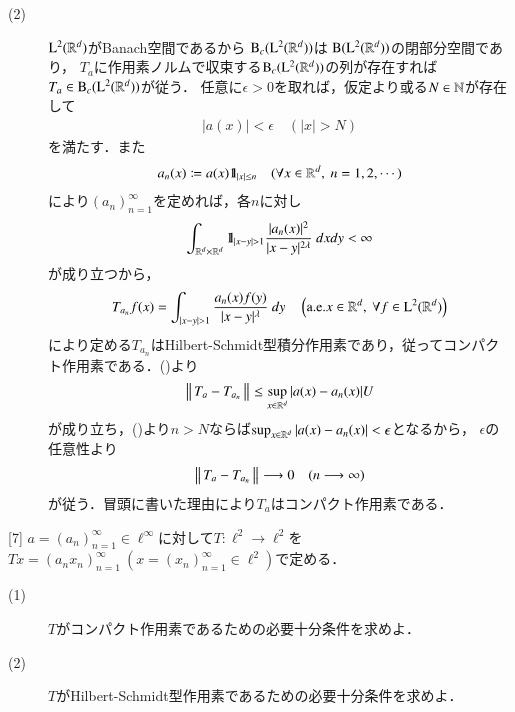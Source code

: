 \begin{prf}
\begin{description}
			\item[(2)] $\mathrm{L}^2(\mathbb{R}^d)$がBanach空間であるから
				$\mathrm{B}_c(\mathrm{L}^2(\mathbb{R}^d)) $は
				$\mathrm{B}(\mathrm{L}^2(\mathbb{R}^d)) $の閉部分空間であり，
				$T_a$に作用素ノルムで収束する$\mathrm{B}_c(\mathrm{L}^2(\mathbb{R}^d)) $の列が存在すれば
				$T_a \in \mathrm{B}_c(\mathrm{L}^2(\mathbb{R}^d)) $が従う．
				任意に$\epsilon > 0$を取れば，仮定より或る$N \in \mathbb{N}$が存在して
				\begin{align}
					|a(x)| < \epsilon \quad (|x| > N)
					\label{eq:report_6_2}
				\end{align}
				を満たす．また
				\begin{align}
					a_n(x) \coloneqq a(x)\mbox{1}\hspace{-0.25em}\mbox{l}_{|x| \leq n}
					\quad (\forall x \in \mathbb{R}^d,\ n=1,2,\cdots)
				\end{align}
				により$(a_n)_{n=1}^{\infty}$を定めれば，各$n$に対し
				\begin{align}
					\int_{\mathbb{R}^d \times \mathbb{R}^d} \mbox{1}\hspace{-0.25em}\mbox{l}_{|x - y| > 1} \frac{|a_n(x)|^2}{|x-y|^{2\lambda}}\ dx dy < \infty
				\end{align}
				が成り立つから，
				\begin{align}
					T_{a_n} f(x) = \int_{|x - y| > 1} \frac{a_n(x)f(y)}{|x-y|^\lambda}\ dy
					\quad \left( \mbox{a.e.}x \in \mathbb{R}^d,\ \forall f \in \mathrm{L}^2(\mathbb{R}^d) \right)
				\end{align}
				により定める$T_{a_n}$はHilbert-Schmidt型積分作用素であり，従ってコンパクト作用素である．()より
				\begin{align}
					\left\|\, T_a - T_{a_n}\, \right\|_{} \leq \operatorname*{sup}_{x \in \mathbb{R}^d} |a(x) - a_n(x)| U
				\end{align}
				が成り立ち，()より$n > N$ならば$\operatorname*{sup}_{x \in \mathbb{R}^d} |a(x) - a_n(x)| < \epsilon$となるから，
				$\epsilon$の任意性より
				\begin{align}
					\left\|\, T_a - T_{a_n}\, \right\|_{} \longrightarrow 0 \quad (n \longrightarrow \infty)
				\end{align}
				が従う．冒頭に書いた理由により$T_a$はコンパクト作用素である．
				\QED
		\end{description}
	\end{prf}
	
\newpage
	\begin{itembox}[l]{[7]}
		$a = (a_n)_{n=1}^{\infty} \in \ell^{\infty}$に対して$T:\ell^2 \rightarrow \ell^2$を
		$Tx = (a_n x_n)_{n=1}^{\infty}\ (x = (x_n)_{n=1}^{\infty} \in \ell^2)$で定める．
		\begin{description}
			\item[(1)] $T$がコンパクト作用素であるための必要十分条件を求めよ．
			\item[(2)] $T$がHilbert-Schmidt型作用素であるための必要十分条件を求めよ．
		\end{description}
	\end{itembox}
	
